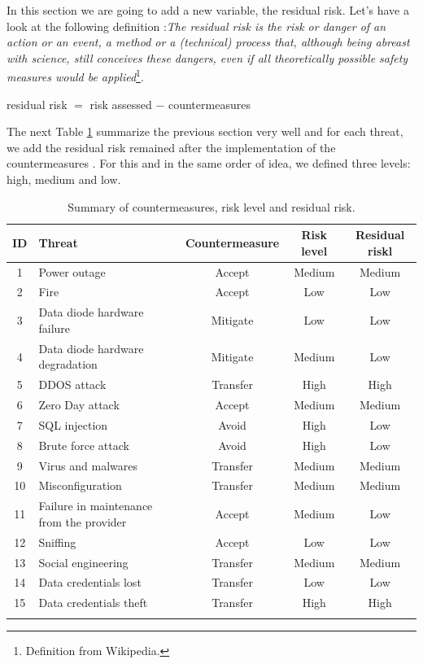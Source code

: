 \documentclass[a4paper,10pt]{article}
\begin{document}
In this section we are going to add a new variable, the residual risk. Let's have a look at the following definition :\emph{The residual risk is the risk or danger of an action or an event, a method or a (technical) process that, although being abreast with science, still conceives these dangers, even if all theoretically possible safety measures would be applied}\footnote{Definition from Wikipedia.}.
\begin{center}
residual risk $=$ risk assessed $-$ countermeasures
\end{center}

The next Table \ref{tab:riskresid} summarize the previous section very well and for each threat, we add the residual risk remained after the implementation of the countermeasures . For this and in the same order of idea, we defined three levels: high, medium and low.
\begin{longtable}{|c|p{4cm}|c|c|c|}
	\hline
	\textbf{ID}& \textbf{Threat}  & \textbf{Countermeasure} & \textbf{Risk level} & \textbf{Residual riskl}          \\
	\hline
	1 & Power outage & Accept & Medium & Medium \\
	\hline
	2 & Fire  & Accept & Low & Low \\
	\hline
	3 & Data diode hardware failure & Mitigate & Low & Low \\
	\hline
	4 & Data diode hardware degradation & Mitigate & Medium & Low  \\
	\hline
	5 & DDOS attack & Transfer & High & High \\
	\hline
	6 & Zero Day attack & Accept & Medium & Medium \\
	\hline
	7 &  SQL injection & Avoid & High & Low \\
	\hline
	8 & Brute force attack & Avoid & High & Low \\
	\hline
	9 & Virus and malwares & Transfer & Medium & Medium \\
	\hline
	10 & Misconfiguration & Transfer & Medium & Medium \\
	\hline
	11 & Failure in maintenance from the provider & Accept & Medium & Low \\
	\hline
	12 & Sniffing & Accept & Low & Low \\
	\hline
	13 & Social engineering & Transfer & Medium & Medium \\
	\hline
	14 & Data credentials lost & Transfer & Low & Low \\
	\hline
	15 & Data credentials theft & Transfer & High & High \\
	\hline
	\caption{Summary of countermeasures, risk level and residual risk.}
	\label{tab:riskresid}
\end{longtable}
\end{document}
